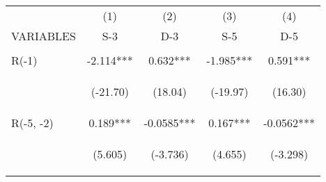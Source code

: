\documentclass[]{article}
\begin{document}
\begin{center}
    \begin{tabular}{lcccc} \hline
                         & (1)                                             & (2)                                            & (3)                                            & (4)                                            \\
        VARIABLES        & S-3                                             & D-3                                            & S-5                                            & D-5                                            \\ \hline
        \vspace{4pt}     & \begin{footnotesize}\end{footnotesize}          & \begin{footnotesize}\end{footnotesize}         & \begin{footnotesize}\end{footnotesize}         & \begin{footnotesize}\end{footnotesize}         \\
        R(-1)            & -2.114***                                       & 0.632***                                       & -1.985***                                      & 0.591***                                       \\
        \vspace{4pt}     & \begin{footnotesize}(-21.70)\end{footnotesize}  & \begin{footnotesize}(18.04)\end{footnotesize}  & \begin{footnotesize}(-19.97)\end{footnotesize} & \begin{footnotesize}(16.30)\end{footnotesize}  \\
        R(-5, -2)        & 0.189***                                        & -0.0585***                                     & 0.167***                                       & -0.0562***                                     \\
        \vspace{4pt}     & \begin{footnotesize}(5.605)\end{footnotesize}   & \begin{footnotesize}(-3.736)\end{footnotesize} & \begin{footnotesize}(4.655)\end{footnotesize}  & \begin{footnotesize}(-3.298)\end{footnotesize} \\

\end{tabular}
\end{center}
\end{document}
